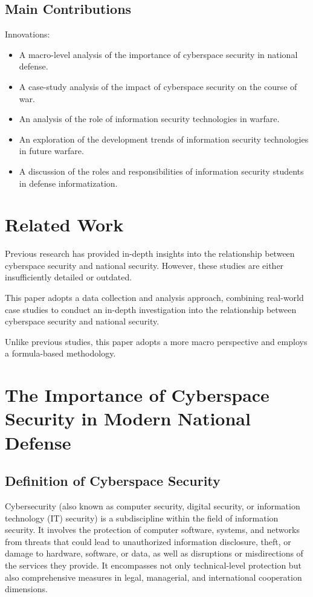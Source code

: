 \documentclass[12pt, a4paper]{article}
\begin{document}
\subsection{Main Contributions}
Innovations:
\begin{itemize}
    \item A macro-level analysis of the importance of cyberspace security in national defense.
    \item A case-study analysis of the impact of cyberspace security on the course of war.
    \item An analysis of the role of information security technologies in warfare.
    \item An exploration of the development trends of information security technologies in future warfare.
    \item A discussion of the roles and responsibilities of information security students in defense informatization.
\end{itemize}

\section{Related Work}\label{sec:related-work}
Previous research has provided in-depth insights into the relationship between cyberspace security and national security. However, these studies are either insufficiently detailed or outdated.

This paper adopts a data collection and analysis approach, combining real-world case studies to conduct an in-depth investigation into the relationship between cyberspace security and national security.

Unlike previous studies, this paper adopts a more macro perspective and employs a formula-based methodology.

\section{The Importance of Cyberspace Security in Modern National Defense}\label{sec:importance}

\subsection{Definition of Cyberspace Security}
Cybersecurity (also known as computer security, digital security, or information technology (IT) security) is a subdiscipline within the field of information security. It involves the protection of computer software, systems, and networks from threats that could lead to unauthorized information disclosure, theft, or damage to hardware, software, or data, as well as disruptions or misdirections of the services they provide. \citep{wikipedia_computer_security}
It encompasses not only technical-level protection but also comprehensive measures in legal, managerial, and international cooperation dimensions.
\end{document}
